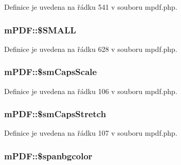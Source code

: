 Definice je uvedena na řádku 541 v souboru mpdf.\-php.

\hypertarget{classm_p_d_f_abe4b5b714940c02912e59c6584ee1801}{
\subsubsection[{\$\-S\-M\-A\-L\-L}]{\setlength{\rightskip}{0pt plus 5cm}m\-P\-D\-F\-::\$\-S\-M\-A\-L\-L}}\label{classm_p_d_f_abe4b5b714940c02912e59c6584ee1801}


Definice je uvedena na řádku 628 v souboru mpdf.\-php.

\hypertarget{classm_p_d_f_a1f83ea7af4a0395d54f57361ac1e7a3e}{
\subsubsection[{\$sm\-Caps\-Scale}]{\setlength{\rightskip}{0pt plus 5cm}m\-P\-D\-F\-::\$sm\-Caps\-Scale}}\label{classm_p_d_f_a1f83ea7af4a0395d54f57361ac1e7a3e}


Definice je uvedena na řádku 106 v souboru mpdf.\-php.

\hypertarget{classm_p_d_f_a13d91fcbefaada82f83d02235fed183a}{
\subsubsection[{\$sm\-Caps\-Stretch}]{\setlength{\rightskip}{0pt plus 5cm}m\-P\-D\-F\-::\$sm\-Caps\-Stretch}}\label{classm_p_d_f_a13d91fcbefaada82f83d02235fed183a}


Definice je uvedena na řádku 107 v souboru mpdf.\-php.

\hypertarget{classm_p_d_f_a5873a82278034615fd6482f22093fdd4}{
\subsubsection[{\$spanbgcolor}]{\setlength{\rightskip}{0pt plus 5cm}m\-P\-D\-F\-::\$spanbgcolor}}\label{classm_p_d_f_a5873a82278034615fd6482f22093fdd4}


